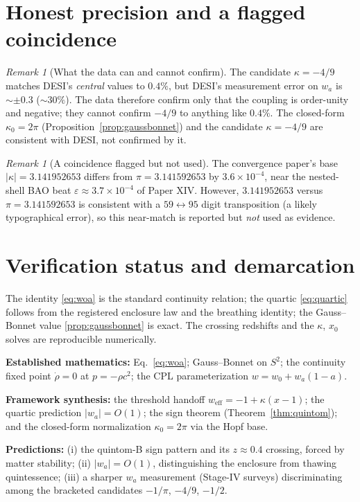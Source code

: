 \documentclass[11pt]{article}
\theoremstyle{remark}
\newtheorem{remark}[theorem]{Remark}
\begin{document}
\section{Honest precision and a flagged coincidence}
\label{sec:honest}
\begin{remark}[What the data can and cannot confirm]
\label{rem:precision}
The candidate $\kappa = -4/9$ matches DESI's \emph{central} values to $0.4\%$, but DESI's measurement error on $w_a$ is $\sim \pm 0.3$ ($\sim 30\%$). The data therefore confirm only that the coupling is order-unity and negative; they cannot confirm $-4/9$ to anything like $0.4\%$. The closed-form $\kappa_0 = 2\pi$ (Proposition~\ref{prop:gaussbonnet}) and the candidate $\kappa = -4/9$ are consistent with DESI, not confirmed by it.
\end{remark}
\begin{remark}[A coincidence flagged but not used]
\label{rem:coincidence}
The convergence paper's base $|\kappa| = 3.141952653$ differs from $\pi = 3.141592653$ by $3.6\times10^{-4}$, near the nested-shell BAO beat $\varepsilon \approx 3.7\times10^{-4}$ of Paper XIV. However, $3.141952653$ versus $\pi = 3.141592653$ is consistent with a $59 \leftrightarrow 95$ digit transposition (a likely typographical error), so this near-match is reported but \emph{not} used as evidence.
\end{remark}

\section{Verification status and demarcation}
\label{sec:verification}
The identity \eqref{eq:woa} is the standard continuity relation; the quartic \eqref{eq:quartic} follows from the registered enclosure law and the breathing identity; the Gauss--Bonnet value \eqref{prop:gaussbonnet} is exact. The crossing redshifts and the $\kappa$, $x_0$ solves are reproducible numerically.

\textbf{Established mathematics:} Eq.~\eqref{eq:woa}; Gauss--Bonnet on $S^2$; the continuity fixed point $\dot\rho = 0$ at $p = -\rho c^2$; the CPL parameterization $w = w_0 + w_a(1-a)$.

\textbf{Framework synthesis:} the threshold handoff $w_{\mathrm{eff}} = -1 + \kappa(x-1)$; the quartic prediction $|w_a| = O(1)$; the sign theorem (Theorem~\ref{thm:quintom}); and the closed-form normalization $\kappa_0 = 2\pi$ via the Hopf base.

\textbf{Predictions:} (i) the quintom-B sign pattern and its $z \approx 0.4$ crossing, forced by matter stability; (ii) $|w_a| = O(1)$, distinguishing the enclosure from thawing quintessence; (iii) a sharper $w_a$ measurement (Stage-IV surveys) discriminating among the bracketed candidates $-1/\pi$, $-4/9$, $-1/2$.
\end{document}

